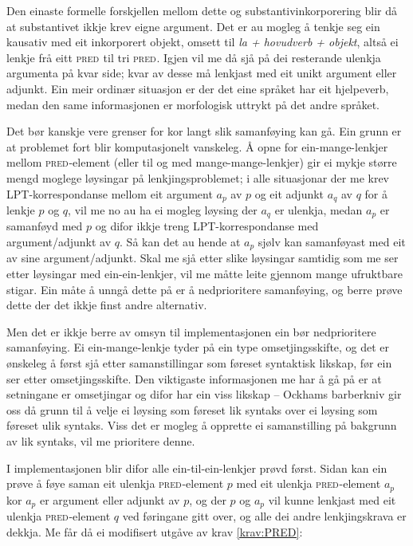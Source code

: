 \documentclass[12pt,a4paper,oneside,draft]{report}
\newcommand{\F}[2]{\textsc{#1}\ensuremath{_{#2}}}
\newcommand{\PRED}{\F{pred}{}}
\begin{document}
Den einaste formelle forskjellen mellom dette og
 substantivinkorporering blir då at substantivet ikkje krev eigne
 argument.  Det er au mogleg å tenkje seg ein kausativ med eit
 inkorporert objekt, omsett til \emph{la + hovudverb + objekt}, altså ei
 lenkje frå eitt \PRED{} til tri \PRED{}. Igjen vil me då sjå på dei
 resterande ulenkja argumenta på kvar side; kvar av desse må lenkjast
 med eit unikt argument eller adjunkt. Ein meir ordinær situasjon er
 der det eine språket har eit hjelpeverb, medan den same informasjonen
 er morfologisk uttrykt på det andre språket.

Det bør kanskje vere grenser for kor langt slik samanføying kan
 gå. Ein grunn er at problemet fort blir komputasjonelt vanskeleg. Å
 opne for ein-mange-lenkjer mellom \PRED{}-element (eller til og med
 mange-mange-lenkjer) gir ei mykje større mengd moglege løysingar på
 lenkjingsproblemet; i alle situasjonar der me krev LPT-korrespondanse
 mellom eit argument $a_p$ av $p$ og eit adjunkt $a_q$ av $q$ for å
 lenkje $p$ og $q$, vil me no au ha ei mogleg løysing der $a_q$ er
 ulenkja, medan $a_p$ er samanføyd med $p$ og difor ikkje treng
 LPT-korrespondanse med argument/adjunkt av $q$. Så kan det au hende
 at $a_p$ sjølv kan samanføyast med eit av sine argument/adjunkt. Skal
 me sjå etter slike løysingar samtidig som me ser etter løysingar med
 ein-ein-lenkjer, vil me måtte leite gjennom mange ufruktbare
 stigar. Ein måte å unngå dette på er å nedprioritere samanføying, og
 berre prøve dette der det ikkje finst andre alternativ.

Men det er ikkje berre av omsyn til implementasjonen ein bør
 nedprioritere samanføying. Ei ein-mange-lenkje tyder på ein type
 omsetjingsskifte, og det er ønskeleg å først sjå etter
 samanstillingar som føreset syntaktisk likskap, før ein ser etter
 omsetjingsskifte. Den viktigaste informasjonen me har å gå på er at
 setningane er omsetjingar og difor har ein viss likskap -- Ockhams
 barberkniv gir oss då grunn til å velje ei løysing som føreset lik
 syntaks over ei løysing som føreset ulik syntaks. Viss det er mogleg
 å opprette ei samanstilling på bakgrunn av lik syntaks, vil me
 prioritere denne.

I implementasjonen blir difor alle ein-til-ein-lenkjer prøvd
 først. Sidan kan ein prøve å føye saman eit ulenkja \PRED{}-element
 $p$ med eit ulenkja \PRED{}-element $a_p$ kor $a_p$ er argument eller
 adjunkt av $p$, og der $p$ og $a_p$ vil kunne lenkjast med eit
 ulenkja \PRED{}-element $q$ ved føringane gitt over, og alle dei
 andre lenkjingskrava er dekkja. Me får då ei modifisert utgåve av
 krav \ref{krav:PRED}:
\end{document}
